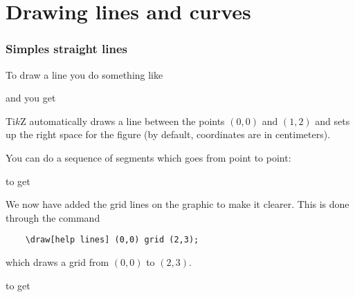 %
%
\section{
  Drawing lines and curves
}
%
%
\begin{frame}[fragile]
  \frametitle{
    Simples straight lines
  }
  To draw a line you do something like

  
  
  and you get

  \begin{center}
    
  \end{center}
  
Ti$k$Z automatically draws a line between the points $(0,0)$ and $(1,2)$ and sets up the right space for the figure (by default, coordinates are in centimeters).
\end{frame}

%
%
\begin{frame}

  You can do a sequence of segments which goes from point to point:

  

  to get

  \begin{center}
    
  \end{center}
  
\end{frame}

%
%
\begin{frame}[fragile]

  We now have added the grid lines on the graphic to make it clearer. This is done through the command

  \begin{lstlisting}
    \draw[help lines] (0,0) grid (2,3);
  \end{lstlisting}

  which draws a grid from $(0,0)$ to $(2,3).$
  
  

  to get

  \begin{center}
    
  \end{center}

\end{frame}

